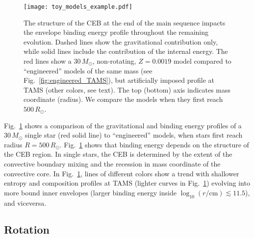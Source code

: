\documentclass[twocolumn,twocolappendix,trackchanges]{aastex63}
\DeclareRobustCommand{\Figref}[1]{Fig.~\ref{#1}}
\begin{document}
\begin{figure}[bp]
  \centering
  \texttt{[image: toy\_models\_example.pdf]}
  \caption{The structure of the CEB at the end of the main sequence
    impacts the envelope binding energy profile throughout the
    remaining evolution. Dashed lines show the gravitational
    contribution only, while solid lines include the contribution of
    the internal energy. The red lines show a $30\,M_\odot$,
    non-rotating, $Z=0.0019$ model compared to ``engineered'' models
    of the same mass (see \Figref{fig:engineered_TAMS}), but
    artificially imposed profile at TAMS (other colors, see text). The
    top (bottom) axis indicates mass coordinate (radius). We compare
    the models when they first reach $500\,R_\odot$.}
  \label{fig:toy_models_example}
\end{figure}


\Figref{fig:toy_models_example} shows a comparison of the
gravitational and binding energy profiles of a $30\,M_\odot$ single
star (red solid line) to
``engineered'' models, when stars first
reach radius $R=500\,R_\odot$. %
\Figref{fig:toy_models_example} shows that
binding energy depends on the structure of the CEB region. In single
stars, the CEB is determined by the extent of the convective boundary
mixing and the recession in mass coordinate of the
convective core. In \Figref{fig:toy_models_example}, lines of
different colors show a trend with shallower entropy and composition
profiles at TAMS (lighter curves in \Figref{fig:toy_models_example})
evolving into more bound inner envelopes (larger
binding energy inside $\log_{10}(r/\mathrm{cm})\lesssim 11.5$), and viceversa.

\subsection{Rotation}
\label{sec:rot_examples}
\end{document}
